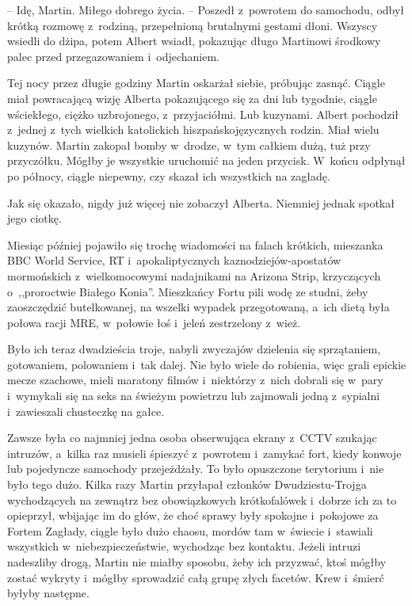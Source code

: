 \documentclass[oneside,polish,11pt,sfheadings]{mwbk}
\begin{document}
-- Idę, Martin. Miłego dobrego życia. -- Poszedł z~powrotem do samochodu,
odbył krótką rozmowę z~rodziną, przepełnioną brutalnymi gestami dłoni.
Wszyscy wsiedli do dżipa, potem Albert wsiadł, pokazując długo Martinowi
środkowy palec przed przegazowaniem i~odjechaniem.

Tej nocy przez długie godziny Martin oskarżał siebie, próbując zasnąć.
Ciągle miał powracającą wizję Alberta pokazującego się za dni lub
tygodnie, ciągle wściekłego, ciężko uzbrojonego, z~przyjaciółmi. Lub
kuzynami. Albert pochodził z~jednej z~tych wielkich katolickich
hiszpańskojęzycznych rodzin. Miał wielu kuzynów. Martin zakopał bomby w~drodze, w~tym całkiem dużą, tuż przy przyczółku. Mógłby je wszystkie
uruchomić na jeden przycisk. W~końcu odpłynął po północy, ciągle
niepewny, czy skazał ich wszystkich na zagładę.

Jak się okazało, nigdy już więcej nie zobaczył Alberta. Niemniej jednak
spotkał jego ciotkę.

Miesiąc później pojawiło się trochę wiadomości na falach krótkich,
mieszanka BBC World Service, RT i~apokaliptycznych
kaznodziejów-apostatów mormońskich z~wielkomocowymi nadajnikami na
Arizona Strip, krzyczących o~,,proroctwie Białego Konia''. Mieszkańcy
Fortu pili wodę ze studni, żeby zaoszczędzić butelkowanej, na wszelki
wypadek przegotowaną, a~ich dietą była połowa racji MRE, w~połowie łoś i~jeleń zestrzelony z~wież.

Było ich teraz dwadzieścia troje, nabyli zwyczajów dzielenia się
sprzątaniem, gotowaniem, polowaniem i~tak dalej. Nie było wiele do
robienia, więc grali epickie mecze szachowe, mieli maratony filmów i~niektórzy z~nich dobrali się w~pary i~wymykali się na seks na świeżym
powietrzu lub zajmowali jedną z~sypialni i~zawieszali chusteczkę na
gałce.

Zawsze była co najmniej jedna osoba obserwująca ekrany z~CCTV szukając
intruzów, a~kilka raz musieli śpieszyć z~powrotem i~zamykać fort, kiedy
konwoje lub pojedyncze samochody przejeżdżały. To było opuszczone
terytorium i~nie było tego dużo. Kilka razy Martin przyłapał członków
Dwudziestu-Trojga wychodzących na zewnątrz bez obowiązkowych
krótkofalówek i~dobrze ich za to opieprzył, wbijając im do głów, że choć
sprawy były spokojne i~pokojowe za Fortem Zagłady, ciągle było dużo
chaosu, mordów tam w~świecie i~stawiali wszystkich w~niebezpieczeństwie,
wychodząc bez kontaktu. Jeżeli intruzi nadeszliby drogą, Martin nie
miałby sposobu, żeby ich przyzwać, ktoś mógłby zostać wykryty i~mógłby
sprowadzić całą grupę złych facetów. Krew i~śmierć byłyby następne.
\end{document}
